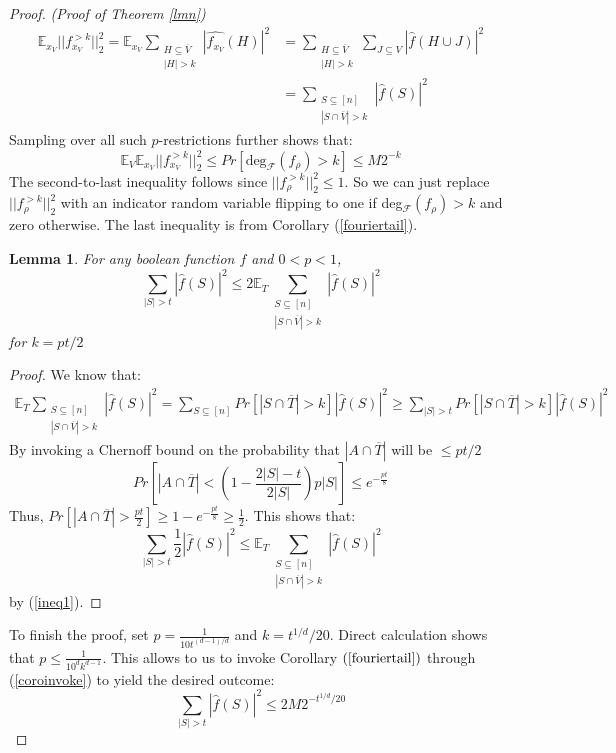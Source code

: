 \documentclass{amsart}
\newtheorem{lemma}[theorem]{Lemma}
\theoremstyle{definition}
\theoremstyle{remark}
\numberwithin{equation}{section}
\theoremstyle{remark}
\begin{document}
\begin{proof}{\emph{(Proof of Theorem \ref{lmn})}}
\begin{align}
  \mathbb{E}_{x_V}||f^{>k}_{x_V}||_2^2 = \mathbb{E}_{x_V}\sum_{\substack {H \subseteq \overline{V} \\ |H| > k}} |\widehat{f_{x_V}}(H)|^2
  & = \sum_{\substack {H \subseteq \overline{V} \\ |H| > k}} \sum_{J \subseteq V} |\hat{f}(H \cup J)|^2 \\
  & = \sum_{ \substack {S \subseteq [n] \\ |S \cap \overline{V}| > k}} |\hat{f}(S)|^2
\end{align}
%
Sampling over all such $p$-restrictions further shows that:
\begin{equation} \label{coroinvoke}
  \mathbb{E}_V\mathbb{E}_{x_V} ||f^{>k}_{x_V}||_2^2 \leq Pr[\text{deg}_{\mathcal{F}}(f_\rho) > k] \leq M2^{-k}
\end{equation}
The second-to-last inequality follows since $||f_\rho^{>k}||_2^2 \leq 1$. So we can just replace $||f_\rho^{>k}||_2^2$ with an indicator random variable flipping to one if deg$_{\mathcal{F}}(f_\rho) > k$ and zero otherwise. The last inequality is from Corollary (\ref{fouriertail}).
%
\begin{lemma}
  For any boolean function $f$ and $0 < p < 1$,
  $$ \sum_{|S| > t} |\hat{f}(S)|^2 \leq 2 \mathbb{E}_T \sum_{ \substack {S \subseteq [n] \\ |S \cap \overline{V}| > k}} |\hat{f}(S)|^2 $$
  for $k = pt/2$
\end{lemma}
%
\begin{proof}
  We know that:
  \begin{align} \label{ineq1}
    \mathbb{E}_T\sum_{ \substack {S \subseteq [n] \\ |S \cap \overline{V}| > k}} |\hat{f}(S)|^2 = \sum_{S \subseteq [n]} Pr[|S \cap \overline{T}| > k]|\hat{f}(S)|^2 \geq \sum_{|S| > t} Pr[|S \cap \overline{T}| > k]|\hat{f}(S)|^2
  \end{align}
  By invoking a Chernoff bound on the probability that $|A \cap \overline{T}|$ will be $\leq pt/2$
  $$  Pr[|A \cap \overline{T}| < (1- \frac{2|S| - t}{2|S|})p|S|] \leq  e^{-\frac{pt }{8}}$$ Thus, $Pr[|A \cap \overline{T}| > \frac{pt}{2}] \geq 1 - e^{-\frac{pt }{8}} \geq \frac{1}{2}$. This shows that:
    $$ \sum_{|S| > t} \frac{1}{2}|\hat{f}(S)|^2 \leq \mathbb{E}_T \sum_{ \substack {S \subseteq [n] \\ |S \cap \overline{V}| > k}} |\hat{f}(S)|^2 $$ by (\ref{ineq1}).
\end{proof}
To finish the proof, set $p = \frac{1}{10t^{(d-1)/d}}$ and $k = t^{1/d}/20$. Direct calculation shows that $p \leq \frac{1}{10^dk^{d-1}}$. This allows to us to invoke Corollary $(\ref{fouriertail})$ through (\ref{coroinvoke}) to yield the desired outcome:
\begin{equation}
  \sum_{|S| > t} |\hat{f}(S)|^2 \leq 2M2^{-t^{1/d}/20}
\end{equation}
\end{proof}
\end{document}
